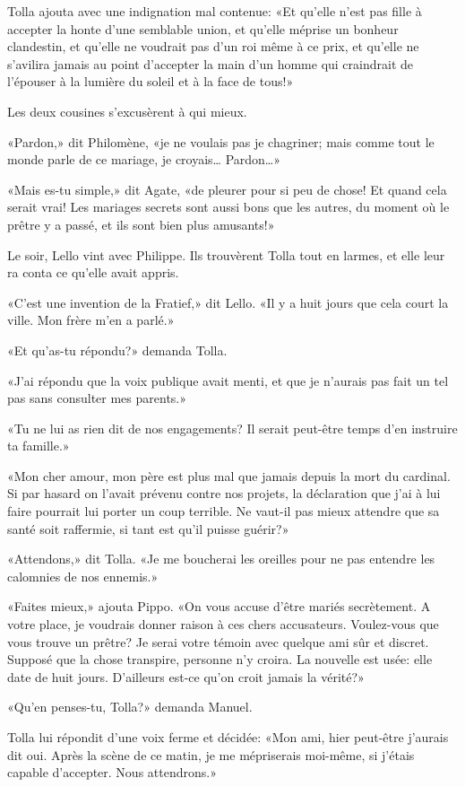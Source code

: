 Tolla ajouta avec une indignation mal contenue: «Et qu'elle n'est pas
fille à accepter la honte d'une semblable union, et qu'elle méprise un
bonheur clandestin, et qu'elle ne voudrait pas d'un roi même à ce prix,
et qu'elle ne s'avilira jamais au point d'accepter la main d'un homme
qui craindrait de l'épouser à la lumière du soleil et à la face de
tous!»

Les deux cousines s'excusèrent à qui mieux.

«Pardon,» dit Philomène, «je ne voulais pas je chagriner; mais comme
tout le monde parle de ce mariage, je croyais\ldots{} Pardon\ldots»

«Mais es-tu simple,» dit Agate, «de pleurer pour si peu de chose! Et
quand cela serait vrai! Les mariages secrets sont aussi bons que les
autres, du moment où le prêtre y a passé, et ils sont bien plus
amusants!»

Le soir, Lello vint avec Philippe. Ils trouvèrent Tolla tout en larmes,
et elle leur ra conta ce qu'elle avait appris.

«C'est une invention de la Fratief,» dit Lello. «Il y a huit jours que
cela court la ville. Mon frère m'en a parlé.»

«Et qu'as-tu répondu?» demanda Tolla.

«J'ai répondu que la voix publique avait menti, et que je n'aurais pas
fait un tel pas sans consulter mes parents.»

«Tu ne lui as rien dit de nos engagements? Il serait peut-être temps
d'en instruire ta famille.»

«Mon cher amour, mon père est plus mal que jamais depuis la mort du
cardinal. Si par hasard on l'avait prévenu contre nos projets, la
déclaration que j'ai à lui faire pourrait lui porter un coup terrible.
Ne vaut-il pas mieux attendre que sa santé soit raffermie, si tant est
qu'il puisse guérir?»

«Attendons,» dit Tolla. «Je me boucherai les oreilles pour ne pas
entendre les calomnies de nos ennemis.»

«Faites mieux,» ajouta Pippo. «On vous accuse d'être mariés secrètement.
A votre place, je voudrais donner raison à ces chers accusateurs.
Voulez-vous que vous trouve un prêtre? Je serai votre témoin avec
quelque ami sûr et discret. Supposé que la chose transpire, personne n'y
croira. La nouvelle est usée: elle date de huit jours. D'ailleurs est-ce
qu'on croit jamais la vérité?»

«Qu'en penses-tu, Tolla?» demanda Manuel.

Tolla lui répondit d'une voix ferme et décidée: «Mon ami, hier peut-être
j'aurais dit oui. Après la scène de ce matin, je me mépriserais
moi-même, si j'étais capable d'accepter. Nous attendrons.»

